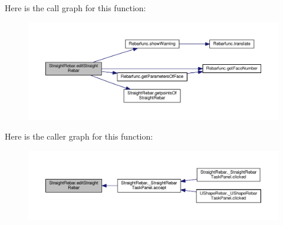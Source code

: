Here is the call graph for this function\+:\nopagebreak
\begin{figure}[H]
\begin{center}
\leavevmode
\includegraphics[width=350pt]{namespaceStraightRebar_ab4c578165b01dd7c7d121e5345de2d7b_cgraph}
\end{center}
\end{figure}




Here is the caller graph for this function\+:\nopagebreak
\begin{figure}[H]
\begin{center}
\leavevmode
\includegraphics[width=350pt]{namespaceStraightRebar_ab4c578165b01dd7c7d121e5345de2d7b_icgraph}
\end{center}
\end{figure}


